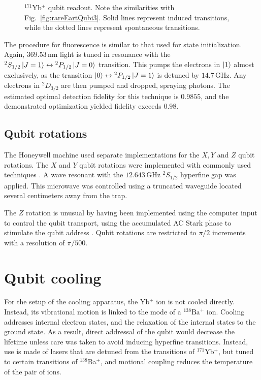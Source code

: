 \documentclass[12pt,a4paper]{amsart}
\numberwithin{equation}{section}
\theoremstyle{plain}
\theoremstyle{definition}
\begin{document}
\begin{figure}
{}
    \caption{${}^{171}$Yb$^+$ qubit readout. Note the similarities with Fig.~\ref{fig:rareEartQubi3}. Solid lines represent induced transitions, while the dotted lines represent spontaneous transitions. \cite{rareEartQubi}}
    \label{fig:rareEartQubi4}
\end{figure}

The procedure for fluorescence is similar to that used for state initialization. Again, $369.53\,$nm light is tuned in resonance with the ${}^2S_{1/2}\ket{J=1}\leftrightarrow {}^2P_{1/2}\ket{J=0}$ transition. This pumps the electrons in $\ket{1}$ almost exclusively, as the transition $\ket{0}\leftrightarrow {}^2P_{1/2}\ket{J=1}$ is detuned by $14.7\,$GHz. Any electrons in ${}^2D_{3/2}$ are then pumped and dropped, spraying photons. The estimated optimal detection fidelity for this technique is $0.9855$, and the demonstrated optimization yielded fidelity exceeds $0.98$.



\subsection{Qubit rotations}


The Honeywell machine used separate implementations for the $X,Y$ and $Z$ qubit rotations. The $X$ and $Y$ qubit rotations were implemented with commonly used techniques \cite{rareEartQubi}. A wave resonant with the $12.643\,$GHz ${}^2S_{1/2}$ hyperfine gap was applied. This microwave was controlled using a truncated waveguide located several centimeters away from the trap.


The $Z$ rotation is unusual by having been implemented using the computer input to control the qubit transport, using the accumulated AC Stark phase to stimulate the qubit address \cite{honeywell}. Qubit rotations are restricted to $\pi/2$ increments with a resolution of $\pi/500$.


\section{Qubit cooling}\label{S:QubiCool}


For the setup of the cooling apparatus, the Yb$^+$ ion is not cooled directly. Instead, its vibrational motion is linked to the mode of a ${}^{138}\mathrm{Ba}^+$ ion. Cooling addresses internal electron states, and the relaxation of the internal states to the ground state. As a result, direct addressal of the qubit would decrease the lifetime unless care was taken to avoid inducing hyperfine transitions. Instead, use is made of lasers that are detuned from the transitions of ${}^{171}$Yb$^+$, but tuned to certain transitions of ${}^{138}$Ba$^+$, and motional coupling reduces the temperature of the pair of ions.
\end{document}
